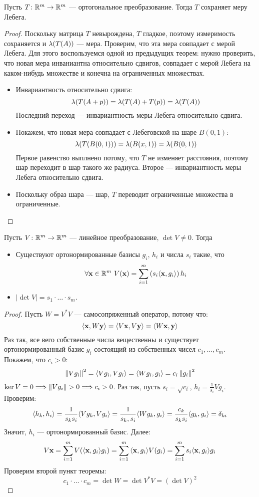 \begin{theorem}
	Пусть $T \colon \mathbb{R}^m \to \mathbb{R}^m$ --- ортогональное преобразование. Тогда $T$ сохраняет меру Лебега.	
\end{theorem}
\begin{proof}
	Поскольку матрица $T$ невырождена, $T$ гладкое, поэтому измеримость сохраняется и 
	$\lambda(T(A))$ --- мера. Проверим, что эта мера совпадает с мерой Лебега. Для этого 
	воспользуемся одной из предыдущих теорем: нужно проверить, что новая мера инваниантна
	относительно сдвигов, совпадает с мерой Лебега на каком-нибудь множестве и 
	конечна на ограниченных множествах.
	\begin{itemize}
		\item Инвариантность относительно сдвига:
\[
	\lambda(T(A + p)) = \lambda(T(A) + T(p)) = \lambda(T(A))
\]
	Последний переход --- инвариантность меры Лебега относительно сдвига.
		\item Покажем, что новая мера совпадает с Лебеговской на шаре $B(0, 1)$:
\[
	\lambda(T(B(0, 1))) = \lambda(B(x, 1)) = \lambda(B(0, 1))	
\]
	Первое равенство выплнено потому, что $T$ не изменяет расстояния, поэтому шар переходит в шар такого 
	же радиуса. Второе --- инвариантность меры Лебега относительно сдвига.
		\item Поскольку образ шара --- шар, $T$ переводит ограниченные множества в ограниченные.
	\end{itemize}
\end{proof}

\begin{theorem}
	Пусть $V \colon \mathbb{R}^m \to \mathbb{R}^m$ --- линейное преобразование, $\det{V} \neq 0$. Тогда
\begin{itemize}
	\item Существуют ортонормированные базисы $g_i$, $h_i$ и числа
		$s_i$ такие, что
\[
	\forall \mathbf{x} \in \mathbb{R}^m~ V(\mathbf{x}) = \sum_{i = 1}^{m}{\left(s_i \langle\mathbf{x}, g_i\rangle\right)h_i} 
\]
	\item $|\det{V}| = s_1 \cdot \ldots \cdot s_m$.
\end{itemize}
\end{theorem}
\begin{proof}
	Пусть $W = V^*V$ --- самосопряженный оператор, потому что:
\[
	\langle\mathbf{x}, W\mathbf{y}\rangle = \langle V\mathbf{x}, V\mathbf{y}\rangle = \langle W\mathbf{x}, \mathbf{y}\rangle
\]
	Раз так, все вего собственные числа вещественны и существует ортонормированный базис $g_i$
	состоящий из собственных чисел $c_1, \ldots, c_m$. Покажем, что $c_i > 0$:
\[
	\left\lVert V g_i\right\rVert^2 = \langle V g_i, V g_i\rangle = \langle W g_i, g_i\rangle = c_i \left\lVert g_i\right\rVert^2
\]
	$\ker{V} = 0 \Longrightarrow \left\lVert V g_i\right\rVert > 0 \Longrightarrow c_i > 0$. Раз так, пусть $s_i = \sqrt{c_i}$, 
	$\displaystyle h_i = \frac{1}{s_i}V g_i$. Проверим:
\[
	\langle h_k, h_i\rangle = \frac{1}{s_k s_i} \langle V g_k, V g_i\rangle = \frac{1}{s_k, s_i} \langle W g_k, g_i\rangle 
	= \frac{c_k}{s_k s_i} \langle g_k, g_i\rangle = \delta_{ki}
\]
	Значит, $h_i$ --- ортонормированный базис. Далее:
\[
	V\mathbf{x} = \sum_{i = 1}^{m}{V(\langle\mathbf{x}, g_i\rangle g_i)} = \sum_{i = 1}^{m}{\langle\mathbf{x}, g_i\rangle V(g_i)}
	= \sum_{i = 1}^{m}{s_i \langle\mathbf{x}, g_i\rangle g_i}
\]
	Проверим второй пункт теоремы:
\[
	c_1 \cdot \ldots \cdot c_m = \det{W} = \det{V^*V} = (\det{V})^2
\]
\end{proof}


